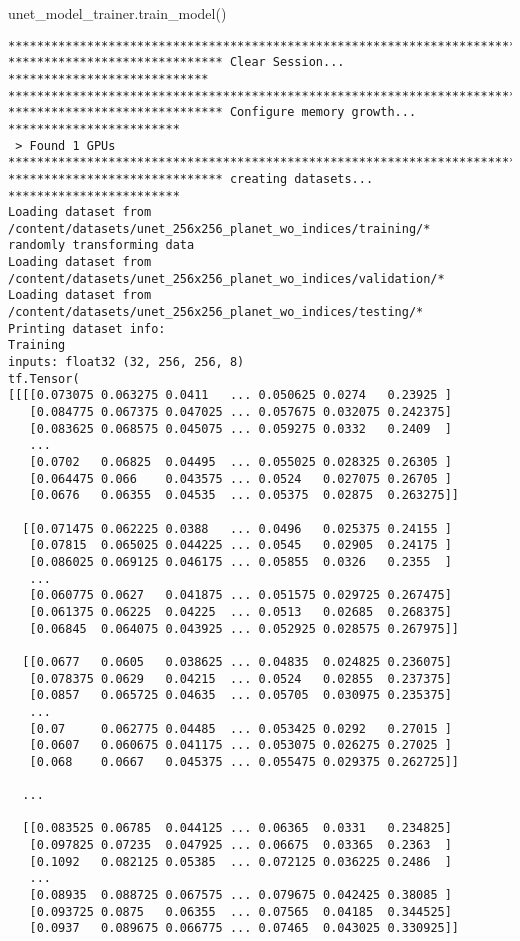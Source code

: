 \documentclass[
  letterpaper,
  DIV=11,
  numbers=noendperiod]{scrreprt}
\newenvironment{Shaded}{\begin{snugshade}}{\end{snugshade}}
\newcommand{\NormalTok}[1]{\textcolor[rgb]{0.00,0.23,0.31}{#1}}
\begin{document}
\begin{Shaded}
\begin{Highlighting}[]
\NormalTok{unet\_model\_trainer.train\_model()}
\end{Highlighting}
\end{Shaded}

\begin{verbatim}
****************************************************************************
****************************** Clear Session... ****************************
****************************************************************************
****************************** Configure memory growth... ************************
 > Found 1 GPUs
****************************************************************************
****************************** creating datasets... ************************
Loading dataset from /content/datasets/unet_256x256_planet_wo_indices/training/*
randomly transforming data
Loading dataset from /content/datasets/unet_256x256_planet_wo_indices/validation/*
Loading dataset from /content/datasets/unet_256x256_planet_wo_indices/testing/*
Printing dataset info:
Training
inputs: float32 (32, 256, 256, 8)
tf.Tensor(
[[[[0.073075 0.063275 0.0411   ... 0.050625 0.0274   0.23925 ]
   [0.084775 0.067375 0.047025 ... 0.057675 0.032075 0.242375]
   [0.083625 0.068575 0.045075 ... 0.059275 0.0332   0.2409  ]
   ...
   [0.0702   0.06825  0.04495  ... 0.055025 0.028325 0.26305 ]
   [0.064475 0.066    0.043575 ... 0.0524   0.027075 0.26705 ]
   [0.0676   0.06355  0.04535  ... 0.05375  0.02875  0.263275]]

  [[0.071475 0.062225 0.0388   ... 0.0496   0.025375 0.24155 ]
   [0.07815  0.065025 0.044225 ... 0.0545   0.02905  0.24175 ]
   [0.086025 0.069125 0.046175 ... 0.05855  0.0326   0.2355  ]
   ...
   [0.060775 0.0627   0.041875 ... 0.051575 0.029725 0.267475]
   [0.061375 0.06225  0.04225  ... 0.0513   0.02685  0.268375]
   [0.06845  0.064075 0.043925 ... 0.052925 0.028575 0.267975]]

  [[0.0677   0.0605   0.038625 ... 0.04835  0.024825 0.236075]
   [0.078375 0.0629   0.04215  ... 0.0524   0.02855  0.237375]
   [0.0857   0.065725 0.04635  ... 0.05705  0.030975 0.235375]
   ...
   [0.07     0.062775 0.04485  ... 0.053425 0.0292   0.27015 ]
   [0.0607   0.060675 0.041175 ... 0.053075 0.026275 0.27025 ]
   [0.068    0.0667   0.045375 ... 0.055475 0.029375 0.262725]]

  ...

  [[0.083525 0.06785  0.044125 ... 0.06365  0.0331   0.234825]
   [0.097825 0.07235  0.047925 ... 0.06675  0.03365  0.2363  ]
   [0.1092   0.082125 0.05385  ... 0.072125 0.036225 0.2486  ]
   ...
   [0.08935  0.088725 0.067575 ... 0.079675 0.042425 0.38085 ]
   [0.093725 0.0875   0.06355  ... 0.07565  0.04185  0.344525]
   [0.0937   0.089675 0.066775 ... 0.07465  0.043025 0.330925]]


\end{verbatim}
\end{document}
